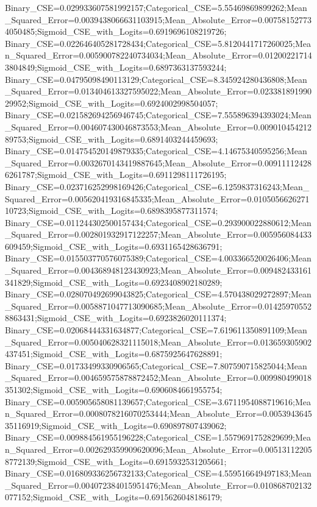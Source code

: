 Binary_CSE=0.029933607581992157;Categorical_CSE=5.55469869899262;Mean_Squared_Error=0.0039438066631103915;Mean_Absolute_Error=0.007581527734050485;Sigmoid_CSE_with_Logits=0.6919696108219726;
Binary_CSE=0.022646405281728434;Categorical_CSE=5.8120441717260025;Mean_Squared_Error=0.005900782240734034;Mean_Absolute_Error=0.012002217143804849;Sigmoid_CSE_with_Logits=0.6897363137593244;
Binary_CSE=0.04795098490113129;Categorical_CSE=8.345924280436808;Mean_Squared_Error=0.013404613327595022;Mean_Absolute_Error=0.02338189199029952;Sigmoid_CSE_with_Logits=0.6924002998504057;
Binary_CSE=0.021582694256946745;Categorical_CSE=7.555896394393024;Mean_Squared_Error=0.004607430046873553;Mean_Absolute_Error=0.00901045421289753;Sigmoid_CSE_with_Logits=0.6891403244459693;
Binary_CSE=0.014754520149879335;Categorical_CSE=4.14675340595256;Mean_Squared_Error=0.0032670143419887645;Mean_Absolute_Error=0.009111124286261787;Sigmoid_CSE_with_Logits=0.6911298111726195;
Binary_CSE=0.023716252998169426;Categorical_CSE=6.1259837316243;Mean_Squared_Error=0.005620419316845335;Mean_Absolute_Error=0.010505662627110723;Sigmoid_CSE_with_Logits=0.6898395877311574;
Binary_CSE=0.011244302500157434;Categorical_CSE=0.293900022880612;Mean_Squared_Error=0.002801932917122257;Mean_Absolute_Error=0.005956084433609459;Sigmoid_CSE_with_Logits=0.6931165428636791;
Binary_CSE=0.015503770576075389;Categorical_CSE=4.003366520026406;Mean_Squared_Error=0.004368948123430923;Mean_Absolute_Error=0.009482433161341829;Sigmoid_CSE_with_Logits=0.6923408902180289;
Binary_CSE=0.028070492699043825;Categorical_CSE=4.570438029272897;Mean_Squared_Error=0.0058871047713090685;Mean_Absolute_Error=0.014259705528863431;Sigmoid_CSE_with_Logits=0.6923826020111374;
Binary_CSE=0.02068444331634877;Categorical_CSE=7.619611350891109;Mean_Squared_Error=0.005040628321115018;Mean_Absolute_Error=0.013659305902437451;Sigmoid_CSE_with_Logits=0.6875925647628891;
Binary_CSE=0.01733499330906565;Categorical_CSE=7.807590715825044;Mean_Squared_Error=0.004659575878872452;Mean_Absolute_Error=0.009980499018351302;Sigmoid_CSE_with_Logits=0.6906084661955754;
Binary_CSE=0.005905658081139657;Categorical_CSE=3.6711954088719616;Mean_Squared_Error=0.0008078216070253444;Mean_Absolute_Error=0.005394364535116919;Sigmoid_CSE_with_Logits=0.690897807439062;
Binary_CSE=0.009884561955196228;Categorical_CSE=1.5579691752829699;Mean_Squared_Error=0.002629359909620096;Mean_Absolute_Error=0.005131122058772139;Sigmoid_CSE_with_Logits=0.6915932531205661;
Binary_CSE=0.016809336256732133;Categorical_CSE=4.559516649497183;Mean_Squared_Error=0.004072384015951476;Mean_Absolute_Error=0.010868702132077152;Sigmoid_CSE_with_Logits=0.6915626048186179;
